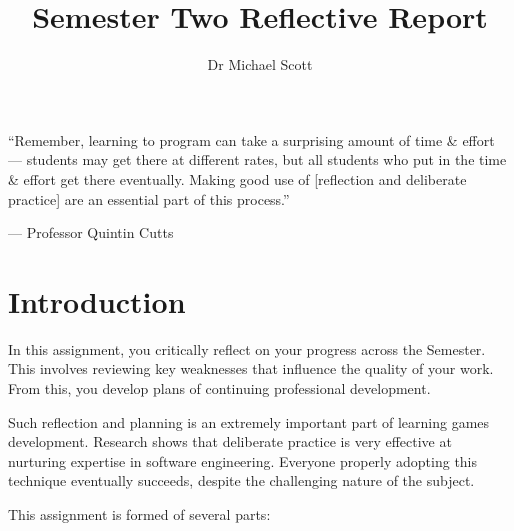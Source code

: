 \documentclass{../fal_assignment}
\title{Semester Two Reflective Report}
\author{Dr Michael Scott}
\begin{document}
\maketitle
%    
\begin{marginquote}
    ``Remember, learning to program can take a surprising amount of time \& effort --- students may get there at different rates, but all students who put in the time \& effort get there eventually. Making good use of [reflection and deliberate practice] are an essential part of this process.''
    
    --- Professor Quintin Cutts
\end{marginquote}
\section*{Introduction}

In this assignment, you critically reflect on your progress across the Semester. This involves reviewing key weaknesses that influence the quality of your work. From this, you develop plans of continuing professional development.

Such reflection and planning is an extremely important part of learning games development. Research shows that deliberate practice is very effective at nurturing expertise in software engineering. Everyone properly adopting this technique eventually succeeds, despite the challenging nature of the subject.

This assignment is formed of several parts:
\end{document}
